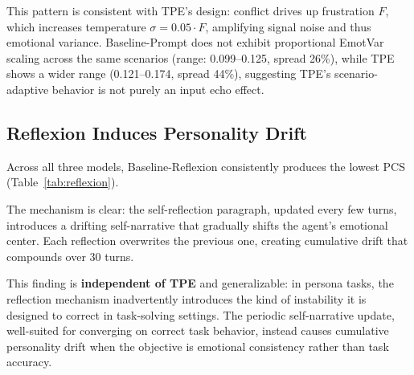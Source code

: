 

This pattern is consistent with TPE's design: conflict drives up frustration $F$, which increases temperature $\sigma = 0.05 \cdot F$, amplifying signal noise and thus emotional variance. Baseline-Prompt does not exhibit proportional EmotVar scaling across the same scenarios (range: 0.099--0.125, spread 26\%), while TPE shows a wider range (0.121--0.174, spread 44\%), suggesting TPE's scenario-adaptive behavior is not purely an input echo effect.

\subsection{Reflexion Induces Personality Drift}
\label{sec:reflexion}

Across all three models, Baseline-Reflexion consistently produces the lowest PCS (Table~\ref{tab:reflexion}).



The mechanism is clear: the self-reflection paragraph, updated every few turns, introduces a drifting self-narrative that gradually shifts the agent's emotional center. Each reflection overwrites the previous one, creating cumulative drift that compounds over 30 turns.

This finding is \textbf{independent of TPE} and generalizable: in persona tasks, the reflection mechanism inadvertently introduces the kind of instability it is designed to correct in task-solving settings. The periodic self-narrative update, well-suited for converging on correct task behavior, instead causes cumulative personality drift when the objective is emotional consistency rather than task accuracy.
